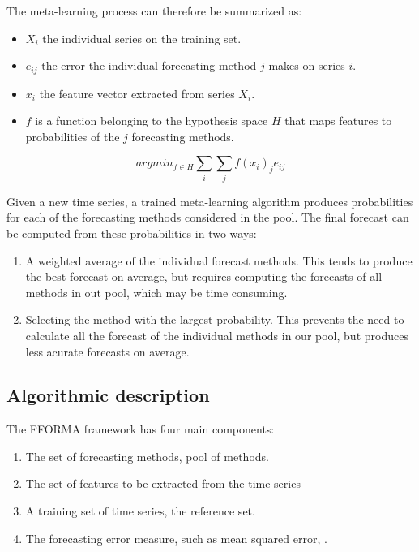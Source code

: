 \documentclass[11pt,a4paper,]{article}
\providecommand{\tightlist}{%
  \setlength{\itemsep}{0pt}\setlength{\parskip}{0pt}}
\theoremstyle{definition}
\theoremstyle{definition}
\theoremstyle{definition}
\theoremstyle{remark}
\begin{document}
The meta-learning process can therefore be summarized as:

\begin{itemize}
\tightlist
\item
  \(X_i\) the individual series on the training set.
\item
  \(e_{ij}\) the error the individual forecasting method \(j\) makes on
  series \(i\).
\item
  \(x_{i}\) the feature vector extracted from series \(X_i\).
\item
  \(f\) is a function belonging to the hypothesis space \(H\) that maps
  features to probabilities of the \(j\) forecasting methods.
\end{itemize}

\[ argmin_{f \in H} \sum_i \sum_j f(x_{i})_je_{ij} \]

Given a new time series, a trained meta-learning algorithm produces
probabilities for each of the forecasting methods considered in the
pool. The final forecast can be computed from these probabilities in
two-ways:

\begin{enumerate}
\def\labelenumi{\arabic{enumi}.}
\tightlist
\item
  A weighted average of the individual forecast methods. This tends to
  produce the best forecast on average, but requires computing the
  forecasts of all methods in out pool, which may be time consuming.
\item
  Selecting the method with the largest probability. This prevents the
  need to calculate all the forecast of the individual methods in our
  pool, but produces less acurate forecasts on average.
\end{enumerate}

\subsection{Algorithmic description}\label{algorithmic-description}

The FFORMA framework has four main components:

\begin{enumerate}
\def\labelenumi{\arabic{enumi}.}
\tightlist
\item
  The set of forecasting methods, pool of methods.
\item
  The set of features to be extracted from the time series
\item
  A training set of time series, the reference set.
\item
  The forecasting error measure, such as mean squared error, .
\end{enumerate}
\end{document}
